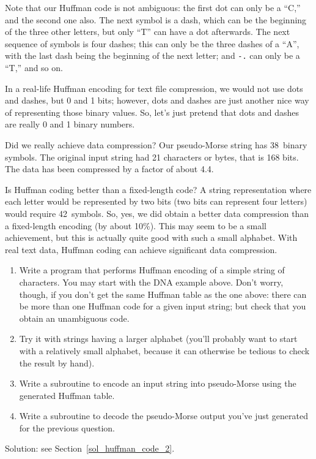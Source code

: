 Note that our Huffman code is not ambiguous: the first dot can 
only be a ``C,'' and the second one also. The next symbol is a 
dash, which can be the beginning of the three other letters, but 
only ``T'' can have a dot afterwards. The next sequence of 
symbols is four dashes; this can only be the three dashes of a 
``A'', with the last dash being the beginning of the next letter; 
and \verb'-.' can only be a ``T,'' and so on.

In a real-life Huffman encoding for text file compression, 
we would not use dots and dashes, but 0 and 1 bits; however,  
dots and dashes are just another nice way of representing 
those binary values. So, let's just pretend that dots and dashes 
are really 0 and 1 binary numbers.

Did we really achieve data compression? Our pseudo-Morse string has 
38~binary symbols. The original input string had 21 characters 
or bytes, that is 168 bits. The data has been compressed by a 
factor of about 4.4. 

Is Huffman coding better than a fixed-length code? A string 
representation where each letter would be represented by two 
bits (two bits can represent four letters) would require 
42~symbols. So, yes, we did obtain a better data compression 
than a fixed-length encoding (by about 10\%). This may seem 
to be a small achievement, but this is actually quite good with 
such a small alphabet. With real text data, Huffman coding can 
achieve significant data compression.


\begin{exercise}
\label{huffman_code_2}
\begin{enumerate}
\item Write a program that performs Huffman encoding of a simple string 
of characters. You may start with the DNA example above. Don't 
worry, though, if you don't get the same Huffman table as the one 
above: there can be more than one Huffman code for a given input 
string; but check that you obtain an unambiguous code. 
\item Try it with strings having a larger alphabet (you'll probably 
want to start with a relatively small alphabet, because it can 
otherwise be tedious to check the result by hand).
\item Write a subroutine to encode an input string into 
pseudo-Morse using the generated Huffman table.
\item Write a subroutine to decode the pseudo-Morse output 
you've just generated for the previous question.
\end{enumerate}
%
Solution: see Section~\ref{sol_huffman_code_2}.
\end{exercise}

